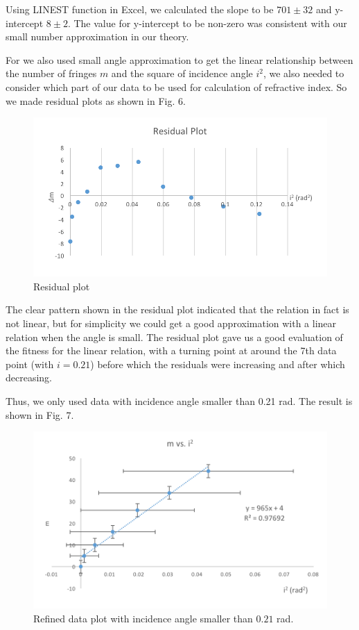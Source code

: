 \documentclass[12pt]{article}
\begin{document}
Using LINEST function in Excel, we calculated the slope to be $701\pm32$ and y-intercept $8\pm2$. The value for y-intercept to be non-zero was consistent with our small number approximation in our theory. 

For we also used small angle approximation to get the linear relationship between the number of fringes $m$ and the square of incidence angle $i^{2}$, we also needed to consider which part of our data to be used for calculation of refractive index. So we made residual plots as shown in Fig. 6. 
\begin{figure}[!hbt]
	\begin{center}
		\includegraphics[width=13cm]{Picture6}
		\caption{Residual plot}
	\end{center}
\end{figure}

The clear pattern shown in the residual plot indicated that the relation in fact is not linear, but for simplicity we could get a good approximation with a linear relation when the angle is small. The residual plot gave us a good evaluation of the fitness for the linear relation, with a turning point at around the 7th data point (with $i=0.21$) before which the residuals were increasing and after which decreasing. 

Thus, we only used data with incidence angle smaller than 0.21 rad. The result is shown in Fig. 7. 
\begin{figure}[!ht]
	\begin{center}
		\includegraphics[width=13cm]{Picture7}
		\caption{Refined data plot with incidence angle smaller than $0.21$ rad.}
	\end{center}
\end{figure}
\end{document}
